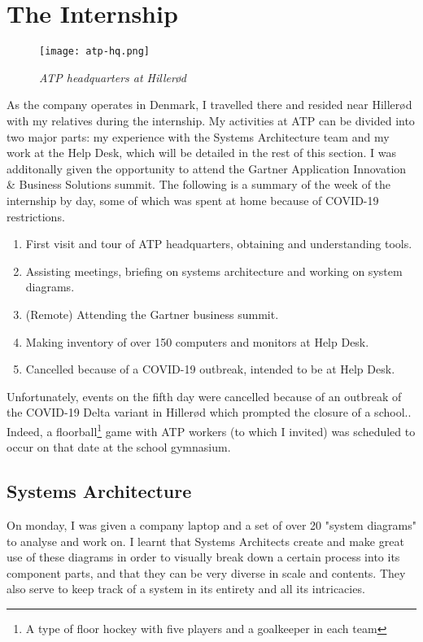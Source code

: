 \section{The Internship}
\begin{figure}[H]
    \centering
        \texttt{[image: atp-hq.png]}
        \caption*{\textit{ATP headquarters at Hillerød\cite{about_atp}}}
\end{figure}

As the company operates in Denmark, I travelled there and resided near Hillerød with my relatives during the internship. My activities at ATP can be divided into two major parts: my experience with the Systems Architecture team and my work at the Help Desk, which will be detailed in the rest of this section. I was additonally given the opportunity to attend the Gartner Application Innovation \& Business Solutions summit. The following is a summary of the week of the internship by day, some of which was spent at home because of COVID-19 restrictions.

\begin{enumerate}
    \item First visit and tour of ATP headquarters, obtaining and understanding tools.
    \item Assisting meetings, briefing on systems architecture and working on system diagrams.
    \item (Remote) Attending the Gartner business summit.
    \item Making inventory of over 150 computers and monitors at Help Desk.
    \item Cancelled because of a COVID-19 outbreak, intended to be at Help Desk.
\end{enumerate}

Unfortunately, events on the fifth day were cancelled because of an outbreak of the COVID-19 Delta variant in Hillerød which prompted the closure of a school.\cite{covid_rip}. Indeed, a floorball\footnote[0]{A type of floor hockey with five players and a goalkeeper in each team} game with ATP workers (to which I invited) was scheduled to occur on that date at the school gymnasium.

\subsection{Systems Architecture}

On monday, I was given a company laptop and a set of over 20 "system diagrams" to analyse and work on. I learnt that Systems Architects create and make great use of these diagrams in order to visually break down a certain process into its component parts, and that they can be very diverse in scale and contents. They also serve to keep track of a system in its entirety and all its intricacies. 

